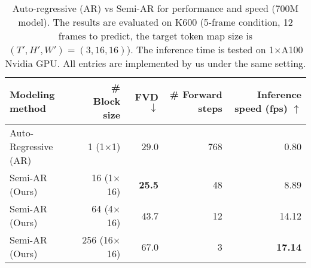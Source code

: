 \begin{table*}[]
\centering
\caption{Auto-regressive (AR) vs Semi-AR for performance and speed (700M model). The results are evaluated on K600 (5-frame condition, 12 frames to predict, the target token map size is $(T', H', W')=(3, 16, 16)$). The inference time is tested on 1$\times$A100 Nvidia GPU. All entries are implemented by us under the same setting.}
\label{table:semiar-ar-mlm}
\setlength{\tabcolsep}{2.0pt}
\vspace{0.04in}
\begin{adjustbox}{max width=\linewidth}



\begin{tabular}{l|r|r|r|r}
\toprule
Modeling method  & \# Block size & FVD $\downarrow$  & \# Forward steps & Inference speed (fps) $\uparrow$ \\ \midrule
Auto-Regressive (AR) & 1 (1$\times$1) & 29.0 & 768     &    0.80      \\ \midrule
Semi-AR (Ours) & 16 (1$\times$16) & \textbf{25.5} & 48        &   8.89       \\ 
Semi-AR (Ours) & 64 (4$\times$16) & 43.7 & 12        &   14.12       \\ 
Semi-AR (Ours) & 256 (16$\times$16) & 67.0 & 3        &   \textbf{17.14}       \\ \bottomrule
\end{tabular}


\end{adjustbox}
\end{table*}
